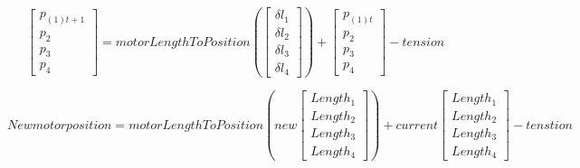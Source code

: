 \documentclass{article}
\begin{document}
\[
\begin{bmatrix}
p_{(1)t+1}\\
p_2\\
p_3\\
p_4
\end{bmatrix}
=
motorLengthToPosition \left(
\begin{bmatrix}
\delta{l_1}\\
\delta{l_2}\\
\delta{l_3}\\
\delta{l_4}
\end{bmatrix}
\right)
+ 
\begin{bmatrix}
p_{(1)t}\\
p_2\\
p_3\\
p_4
\end{bmatrix}
- tension
\]

\[
New motor position =
motorLengthToPosition \left(
new
\begin{bmatrix}
Length_1\\
Length_2\\
Length_3\\
Length_4
\end{bmatrix}
\right)
+ current
\begin{bmatrix}
Length_1\\
Length_2\\
Length_3\\
Length_4
\end{bmatrix}
- tenstion
\]
\end{document}
